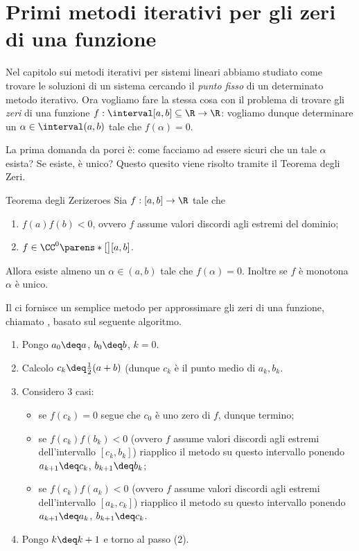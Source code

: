 \section{Primi metodi iterativi per gli zeri di una funzione}

Nel capitolo sui metodi iterativi per sistemi lineari abbiamo studiato come trovare le soluzioni di un sistema cercando il \emph{punto fisso} di un determinato metodo iterativo. Ora vogliamo fare la stessa cosa con il problema di trovare gli \emph{zeri} di una funzione $f : \interval[{a, b}] \subseteq \R \to \R$: vogliamo dunque determinare un $\alpha \in \interval({a, b})$ tale che $f(\alpha) = 0$.

La prima domanda da porci è: come facciamo ad essere sicuri che un tale $\alpha$ esista? Se esiste, è unico? Questo quesito viene risolto tramite il Teorema degli Zeri.

\begin{theorem}
    {Teorema degli Zeri}{zeroes}
    Sia $f : [a, b] \to \R$ tale che \begin{enumerate}
        \item $f(a)f(b) < 0$, ovvero $f$ assume valori discordi agli estremi del dominio;
        \item $f \in \CC^0\parens*[\big]{[a, b]}$. 
    \end{enumerate} Allora esiste almeno un $\alpha \in (a, b)$ tale che $f(\alpha) = 0$. Inoltre se $f$ è monotona $\alpha$ è unico. 
\end{theorem}

Il  ci fornisce un semplice metodo per approssimare gli zeri di una funzione, chiamato , basato sul seguente algoritmo.

\begin{enumerate}[(1)]
    \item Pongo $a_0 \deq a$, $b_0 \deq b$, $k = 0$. 
    \item Calcolo $c_k \deq \frac12(a + b)$ (dunque $c_k$ è il punto medio di $a_k, b_k$.
    \item Considero $3$ casi: 
    \begin{itemize}
        \item se $f(c_k) = 0$ segue che $c_0$ è uno zero di $f$, dunque termino;
        \item se $f(c_k)f(b_k) < 0$ (ovvero $f$ assume valori discordi agli estremi dell'intervallo $[c_k, b_k]$) riapplico il metodo su questo intervallo ponendo $a_{k+1} \deq c_k$, $b_{k+1} \deq b_k$;
        \item se $f(c_k)f(a_k) < 0$ (ovvero $f$ assume valori discordi agli estremi dell'intervallo $[a_k, c_k]$) riapplico il metodo su questo intervallo ponendo $a_{k+1} \deq a_k$, $b_{k+1} \deq c_k$.
    \end{itemize}
    \item Pongo $k \deq k+1$ e torno al passo (2).
\end{enumerate}

